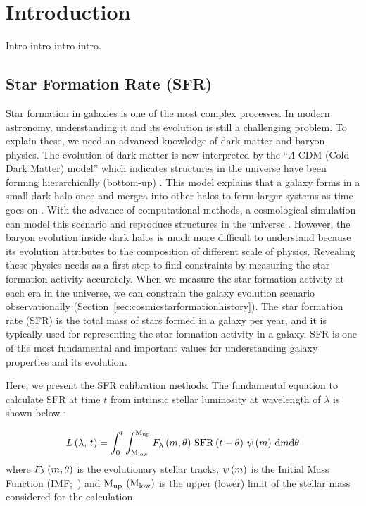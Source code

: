 \chapter{Introduction}\label{chap:introduction}
\begin{chapabstract}

Intro intro intro intro.

\end{chapabstract}

\section{Star Formation Rate (SFR)}\label{sec:starformationrate}

Star formation in galaxies is one of the most complex processes.
In modern astronomy, understanding it and its evolution is still a challenging problem.
To explain these, we need an advanced knowledge of dark matter and baryon physics.
The evolution of dark matter is now interpreted by the ``$\Lambda$ CDM (Cold Dark Matter) model'' which indicates structures in the universe have been forming hierarchically (bottom-up) \citep[e.g.,][]{Peebles1982}.
This model explains that a galaxy forms in a small dark halo once and mergea into other halos to form larger systems as time goes on \citep{Blumenthal1984}.
With the advance of computational methods, a cosmological simulation can model this scenario and reproduce structures in the universe \citep[e.g.,][]{Navarro2000, Vale2004}.
However, the baryon evolution inside dark halos is much more difficult to understand because its evolution attributes to the composition of different scale of physics.
Revealing these physics needs as a first step to find constraints by measuring the star formation activity accurately.
When we measure the star formation activity at each era in the universe, we can constrain the galaxy evolution scenario observationally (Section~\ref{sec:cosmicstarformationhistory}).
The star formation rate (SFR) is the total mass of stars formed in a galaxy per year, and it is typically used for representing the star formation activity in a galaxy.
SFR is one of the most fundamental and important values for understanding galaxy properties and its evolution.

Here, we present the SFR calibration methods.
The fundamental equation to calculate SFR at time $t$ from intrinsic stellar luminosity at wavelength of $\lambda$ is shown below \citep{Buat1991}:

\begin{equation}\label{eq:Buat1991eq1}
    L\left(\lambda,\,t\right)=\int_{0}^{t} \int_{\mathrm{M}_{\mathrm{low}}}^{\mathrm{M}_{\mathrm{up}}} F_{\lambda}\left(m, \theta\right)\,\mathrm{SFR}\left(t-\theta\right)\,\psi\left(m\right)\,\mathrm{d}m \mathrm{d} \theta
\end{equation}
where $F_{\lambda}\left(m, \theta\right)$ is the evolutionary stellar tracks, $\psi\left(m\right)$ is the Initial Mass Function (IMF;~\citealt{Salpeter1955, Kroupa2001, Chabrier2003}) and $\mathrm{M}_{\mathrm{up}}$ $\left(\mathrm{M}_{\mathrm{low}}\right)$ is the upper (lower) limit of the stellar mass considered for the calculation.

